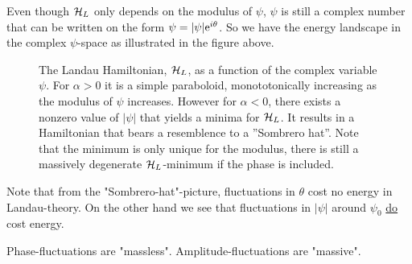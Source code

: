 Even though $\mathcal{H}_L$ only depends on the modulus of $\psi$, $\psi$ is still a complex number that can be written on the form $\psi=|\psi| \mathrm{e}^{i\theta}$. So we have the  energy landscape in the complex $\psi$-space as illustrated in the figure above.
\begin{figure}
\centering
{}
\caption{The Landau Hamiltonian, $\mathcal{H}_L$, as a function of the complex variable $\psi$. For $\alpha>0$ it is a simple paraboloid, monototonically increasing as the modulus of $\psi$ increases. However for $\alpha<0$, there exists a nonzero value of $|\psi|$ that yields a minima for $\mathcal{H}_L$.  It results in a Hamiltonian that bears a resemblence to a ''Sombrero hat''. Note that the minimum is only unique for the modulus, there is still a massively degenerate $\mathcal{H}_L$-minimum if the phase is included.}
\label{fig:1D_H}
\end{figure}

Note that from the "Sombrero-hat"-picture, fluctuations in $\theta$ cost no energy in Landau-theory. On the other hand we see that fluctuations in $|\psi|$ around $\psi_0$ \underline{do} cost energy. 


Phase-fluctuations are "massless". Amplitude-fluctuations are "massive". 

